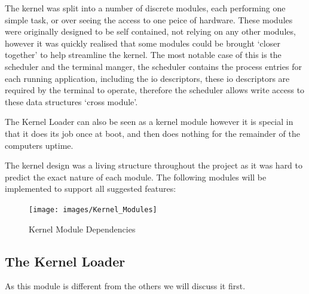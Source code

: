 \documentclass[a4paper]{report}
\begin{document}
The kernel was split into a number of discrete modules, each performing one simple task, or over seeing the access to one peice of hardware. These modules were originally designed to be self contained, not relying on any other modules, however it was quickly realised that some modules could be brought `closer together' to help streamline the kernel. The most notable case of this is the scheduler and the terminal manger, the scheduler contains the process entries for each running application, including the io descriptors, these io descriptors are required by the terminal to operate, therefore the scheduler allows write access to these data structures `cross module'.

The Kernel Loader can also be seen as a kernel module however it is special in that it does its job once at boot, and then does nothing for the remainder of the computers uptime.


The kernel design was a living structure throughout the project as it was hard to predict the exact nature of each module. The following modules will be implemented to support all suggested features:

\begin{figure}[ht]
\centering
\texttt{[image: images/Kernel\_Modules]}
\caption{Kernel Module Dependencies}
\label{fig:WinTitleBarScreen}
\end{figure}


\subsection{The Kernel Loader}

As this module is different from the others we will discuss it first.
\end{document}
